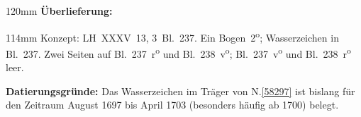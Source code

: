 \begin{ledgroupsized}[r]{120mm}
\footnotesize
\pstart
\noindent\textbf{Überlieferung:}
\pend
\end{ledgroupsized}
\begin{ledgroupsized}[r]{114mm}
\footnotesize
\pstart \parindent -6mm
%
Konzept:
LH~XXXV~13, 3~Bl.~237. 
Ein Bogen~2\textsuperscript{o};
Wasserzeichen		%
in Bl.~237.
Zwei Seiten auf Bl.~237~r\textsuperscript{o} und Bl.~238~v\textsuperscript{o}; 
Bl.~237~v\textsuperscript{o} und Bl.~238~r\textsuperscript{o} leer.
\pend
\end{ledgroupsized}
\vspace{5mm}
\begin{ledgroup}
\footnotesize
\pstart
\noindent%
\textbf{Datierungsgründe:} %
Das Wasserzeichen im Träger von N.\;\ref{58297} ist bislang für den Zeitraum August 1697 bis April 1703 (besonders häufig ab 1700) belegt. %
\pend
\end{ledgroup}

